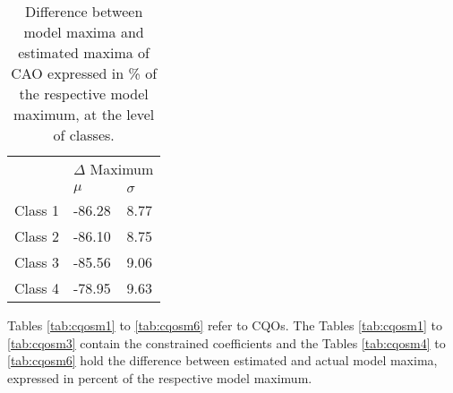 			\vspace{10em}
		
			\begin{table}[h!]	
			
				\normalsize
				\caption{Difference between model maxima and estimated maxima of CAO expressed in \% of the respective model maximum, at the level of classes.}
				\centering
			
				\begin{tabular}{@{}lll@{}}
					\toprule
					& \multicolumn{2}{c}{$\Delta$ Maximum} \\ \cmidrule{2-3}
					& $\mu$   & $\sigma$   \\
					\hline
					Class 1 & -86.28 & 8.77 \\
					Class 2 & -86.10 & 8.75 \\
					Class 3 & -85.56 & 9.06 \\
					Class 4 & -78.95 & 9.63 \\
					\toprule
				\end{tabular}
			
			\label{tab:caosm4}
		
		\end{table}
			
			\vspace{15em}
			
		
		Tables \ref{tab:cqosm1} to \ref{tab:cqosm6} refer to CQOs.
		The Tables \ref{tab:cqosm1} to \ref{tab:cqosm3} contain the constrained coefficients and the Tables \ref{tab:cqosm4} to \ref{tab:cqosm6} hold the difference between estimated and actual model maxima, expressed in percent of the respective model maximum.
		
